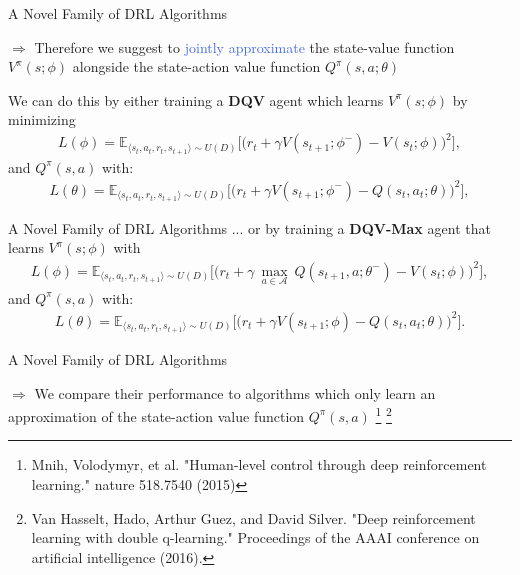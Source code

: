 \documentclass{beamer}
\begin{document}
\begin{frame}{A Novel Family of DRL Algorithms}	
	\bigskip

	$\Rightarrow$ Therefore we suggest to \textcolor{RoyalBlue}{jointly approximate} the state-value function $V^{\pi}(s;\phi)$ alongside the state-action value function $Q^{\pi}(s,a;\theta)$

	\bigskip

	We can do this by either training a \textcolor{skymagenta}{\textbf{DQV}} agent which learns $V^{\pi}(s;\phi)$ by minimizing
		\begin{multline*}
L(\phi) = \mathds{E}_{\langle s_{t},a_{t},r_{t},s_{t+1}\rangle\sim U(D)} \bigg[\big(r_{t} + \gamma V(s_{t+1}; \phi^{-}) - V(s_{t}; \phi)\big)^{2}\bigg],
		\end{multline*}			
		and $Q^{\pi}(s,a)$ with:
		\begin{multline*}
    			L(\theta) = \mathds{E}_{\langle s_{t},a_{t},r_{t},s_{t+1}\rangle\sim U(D)} \bigg[\big(r_{t} + \gamma V(s_{t+1}; \phi^{-}) - Q(s_{t}, a_{t}; \theta)\big)^{2}\bigg],
		\end{multline*}

\end{frame}

\begin{frame}{A Novel Family of DRL Algorithms}
	... or by training a \textcolor{skymagenta}{\textbf{DQV-Max}} agent that learns $V^{\pi}(s;\phi)$ with
	\begin{multline*}
		L(\phi) = \mathds{E}_{\langle s_{t},a_{t},r_{t},s_{t+1}\rangle\sim U(D)} \bigg[\big(r_{t} + \gamma \: \underset{a\in \mathcal{A}}{\max}\: Q(s_{t+1}, a; \theta^{-}) - V(s_{t}; \phi)\big)^{2}\bigg],
	\end{multline*}
	and $Q^{\pi}(s,a)$ with:
	\begin{multline*}
    		L(\theta) = \mathds{E}_{\langle s_{t},a_{t},r_{t},s_{t+1}\rangle\sim U(D)} \bigg[\big(r_{t} + \gamma V(s_{t+1}; \phi) - Q(s_{t}, a_{t}; \theta)\big)^{2}\bigg].
	\end{multline*}
\end{frame}

\begin{frame}{A Novel Family of DRL Algorithms}
	\bigskip

	$\Rightarrow$ We compare their performance to algorithms which only learn an approximation of the state-action value function $Q^\pi(s,a)$ \footnote{Mnih, Volodymyr, et al. "Human-level control through deep reinforcement learning." nature 518.7540 (2015)} \footnote{Van Hasselt, Hado, Arthur Guez, and David Silver. "Deep reinforcement learning with double q-learning." Proceedings of the AAAI conference on artificial intelligence (2016).}

\end{frame}
\end{document}
